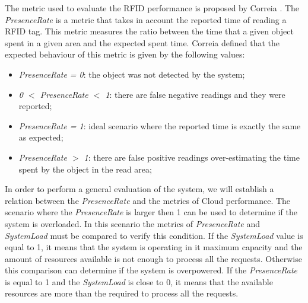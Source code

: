 The metric used to evaluate the RFID performance is proposed by Correia \cite{Correia:Thesis:2014}.
The \textit{PresenceRate} is a metric that takes in account the reported time of reading a RFID tag.
This metric measures the ratio between the time that a given object spent in a given area and the
expected spent time. Correia \cite{Correia:Thesis:2014} defined that the expected behaviour of this
metric is given by the following values:
\begin{itemize}
  \item \textit{PresenceRate = 0}: the object was not detected by the system;
  \item \textit{0 $<$ PresenceRate $<$ 1}: there are false negative readings and they were reported;
  \item \textit{PresenceRate = 1}: ideal scenario where the reported time is exactly the same as expected;
  \item \textit{PresenceRate $>$ 1}: there are false positive readings over-estimating the time
  spent by the object in the read area;
\end{itemize}

In order to perform a general evaluation of the system, we will establish a relation
between the \textit{PresenceRate} and the metrics of Cloud performance. The scenario where
the \textit{PresenceRate} is larger then 1 can be used to determine if the system is overloaded.
In this scenario the metrics of \textit{PresenceRate} and \textit{SystemLoad} must be compared to
verify this condition. If the \textit{SystemLoad} value is equal to 1, it means that the system
is operating in it maximum capacity and the amount of resources available is not enough to
process all the requests. Otherwise this comparison can determine if the system is overpowered.
If the \textit{PresenceRate} is equal to 1 and the \textit{SystemLoad} is close to 0, it means that the
available resources are more than the required to process all the requests.
